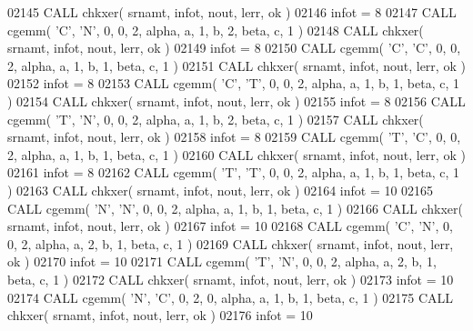 \begin{DoxyCode}
02145       \textcolor{keyword}{CALL }chkxer( srnamt, infot, nout, lerr, ok )
02146       infot = 8
02147       \textcolor{keyword}{CALL }cgemm( \textcolor{stringliteral}{'C'}, \textcolor{stringliteral}{'N'}, 0, 0, 2, alpha, a, 1, b, 2, beta, c, 1 )
02148       \textcolor{keyword}{CALL }chkxer( srnamt, infot, nout, lerr, ok )
02149       infot = 8
02150       \textcolor{keyword}{CALL }cgemm( \textcolor{stringliteral}{'C'}, \textcolor{stringliteral}{'C'}, 0, 0, 2, alpha, a, 1, b, 1, beta, c, 1 )
02151       \textcolor{keyword}{CALL }chkxer( srnamt, infot, nout, lerr, ok )
02152       infot = 8
02153       \textcolor{keyword}{CALL }cgemm( \textcolor{stringliteral}{'C'}, \textcolor{stringliteral}{'T'}, 0, 0, 2, alpha, a, 1, b, 1, beta, c, 1 )
02154       \textcolor{keyword}{CALL }chkxer( srnamt, infot, nout, lerr, ok )
02155       infot = 8
02156       \textcolor{keyword}{CALL }cgemm( \textcolor{stringliteral}{'T'}, \textcolor{stringliteral}{'N'}, 0, 0, 2, alpha, a, 1, b, 2, beta, c, 1 )
02157       \textcolor{keyword}{CALL }chkxer( srnamt, infot, nout, lerr, ok )
02158       infot = 8
02159       \textcolor{keyword}{CALL }cgemm( \textcolor{stringliteral}{'T'}, \textcolor{stringliteral}{'C'}, 0, 0, 2, alpha, a, 1, b, 1, beta, c, 1 )
02160       \textcolor{keyword}{CALL }chkxer( srnamt, infot, nout, lerr, ok )
02161       infot = 8
02162       \textcolor{keyword}{CALL }cgemm( \textcolor{stringliteral}{'T'}, \textcolor{stringliteral}{'T'}, 0, 0, 2, alpha, a, 1, b, 1, beta, c, 1 )
02163       \textcolor{keyword}{CALL }chkxer( srnamt, infot, nout, lerr, ok )
02164       infot = 10
02165       \textcolor{keyword}{CALL }cgemm( \textcolor{stringliteral}{'N'}, \textcolor{stringliteral}{'N'}, 0, 0, 2, alpha, a, 1, b, 1, beta, c, 1 )
02166       \textcolor{keyword}{CALL }chkxer( srnamt, infot, nout, lerr, ok )
02167       infot = 10
02168       \textcolor{keyword}{CALL }cgemm( \textcolor{stringliteral}{'C'}, \textcolor{stringliteral}{'N'}, 0, 0, 2, alpha, a, 2, b, 1, beta, c, 1 )
02169       \textcolor{keyword}{CALL }chkxer( srnamt, infot, nout, lerr, ok )
02170       infot = 10
02171       \textcolor{keyword}{CALL }cgemm( \textcolor{stringliteral}{'T'}, \textcolor{stringliteral}{'N'}, 0, 0, 2, alpha, a, 2, b, 1, beta, c, 1 )
02172       \textcolor{keyword}{CALL }chkxer( srnamt, infot, nout, lerr, ok )
02173       infot = 10
02174       \textcolor{keyword}{CALL }cgemm( \textcolor{stringliteral}{'N'}, \textcolor{stringliteral}{'C'}, 0, 2, 0, alpha, a, 1, b, 1, beta, c, 1 )
02175       \textcolor{keyword}{CALL }chkxer( srnamt, infot, nout, lerr, ok )
02176       infot = 10

\end{DoxyCode}
